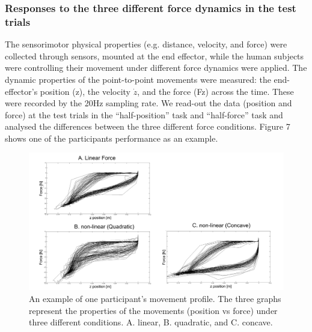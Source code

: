 \subsubsection{Responses to the three different force dynamics in the test trials}
The sensorimotor physical properties (e.g. distance, velocity, and force) were collected through sensors, mounted at the end effector, while the human subjects were controlling their movement under different force dynamics were applied. The dynamic properties of the point-to-point movements were measured: the end-effector’s position (z), the velocity $\dot{z}$, and the force (Fz) across the time. These were recorded by the 20Hz sampling rate. We read-out the data (position and force) at the test trials in the “half-position” task and “half-force” task and analysed the differences between the three different force conditions. Figure 7 shows one of the participants performance as an example.
%
\begin{figure}
  \centering
  \includegraphics[scale=0.5]{Chie/figs/Figure7.png}
  \caption{An example of one participant’s movement profile. The three graphs represent the properties of the movements (position vs force) under three different conditions. A. linear, B. quadratic, and C. concave.}
  \label{modelling}
\end{figure}
